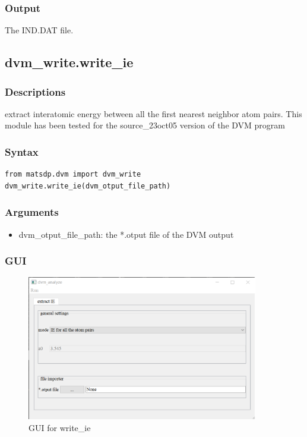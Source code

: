 \documentclass[12pt]{book}
\begin{document}
\subsubsection{Output}

The IND.DAT file.


\subsection{dvm\_write.write\_ie}
\subsubsection{Descriptions}
extract interatomic energy between all the first nearest neighbor atom pairs. This module has been tested for the source\_23oct05 version of the DVM program

\subsubsection{Syntax}
\begin{lstlisting}
from matsdp.dvm import dvm_write
dvm_write.write_ie(dvm_otput_file_path)
\end{lstlisting}

\subsubsection{Arguments}

\begin{itemize}
\item dvm\_otput\_file\_path: the *.otput file of the DVM output
\end{itemize}

\subsubsection{GUI}

\begin{figure}[htbp]
\centering
\includegraphics[width=0.9\textwidth]{gui_write_ie.pdf}
\caption{GUI for write\_ie}
\label{fig:GUI_write_ie}
\end{figure}
\end{document}

